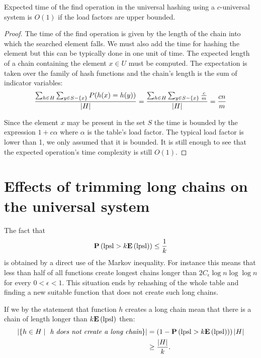 \begin{theorem}
\label{theorem-expected-chain-length-universal}
Expected time of the find operation in the universal hashing using a $c$-universal system is $O(1)$ if the load factors are upper bounded.
\end{theorem}
\begin{proof}
The time of the find operation is given by the length of the chain into which the searched element falls. We must also add the time for hashing the element but this can be typically done in one unit of time. The expected length of a chain containing the element $x \in U$ must be computed. The expectation is taken over the family of hash functions and the chain's length is the sum of indicator variables:
\begin{displaymath}
\frac{\sum\displaylimits_{h \in H} \sum\displaylimits_{y \in S - \lbrace x \rbrace} P(h(x) = h(y))}{|H|} = \frac{\sum\displaylimits_{h \in H} \sum\displaylimits_{y \in S - \lbrace x \rbrace} \frac{c}{m}}{|H|} = \frac{cn}{m}
\end{displaymath}

Since the element $x$ may be present in the set $S$ the time is bounded by the expression $1 + c\alpha$ where $\alpha$ is the table's load factor. The typical load factor is lower than 1, we only assumed that it is bounded. It is still enough to see that the expected operation's time complexity is still $O(1)$.
\end{proof}

\section{Effects of trimming long chains on the universal system}
The fact that \[ \mathbf{P}\left(\mathrm{lpsl} > k \mathbf{E}\left(\mathrm{lpsl}\right)\right) \leq \frac{1}{k} \] is obtained by a direct use of the Markov inequality. For instance this means that less than half of all functions create longest chains longer than $2C_\epsilon \log n \log \log n$ for every $0 < \epsilon < 1$. This situation ends by rehashing of the whole table and finding a new suitable function that does not create such long chains.

If we by the statement that function $h$ creates a long chain mean that there is a chain of length longer than $k \mathbf{E}\left(\mathrm{lpsl}\right)$ then:
\begin{displaymath}
\begin{split}
|\lbrace h \in H \mid \textit{ h does not create a long chain} \rbrace| 
	& = \left(1 - \mathbf{P}\left(\mathrm{lpsl} > k \mathbf{E}\left(\mathrm{lpsl}\right)\right)\right) |H|  \\
	& \geq \frac{|H|}{k} \text{.}
\end{split}
\end{displaymath}

